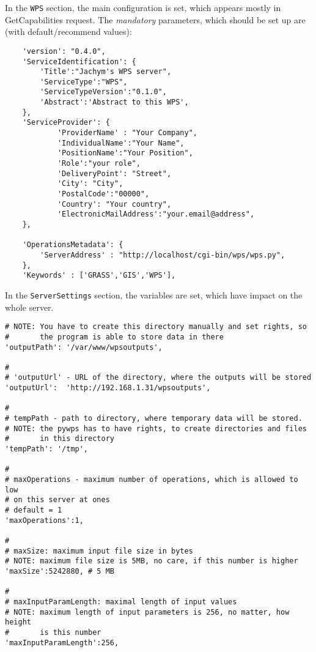 \documentclass[a4paper,11pt]{article}
\begin{document}
     
    In the \texttt{WPS} section, the main configuration is set, which appears mostly in
    GetCapabilities request. The \emph{mandatory} parameters, which should be set up
    are (with default/recommend values):
     

    \begin{verbatim}
    'version': "0.4.0",
    'ServiceIdentification': {
        'Title':"Jachym's WPS server",
        'ServiceType':"WPS",
        'ServiceTypeVersion':"0.1.0",
        'Abstract':'Abstract to this WPS',
    },
    'ServiceProvider': {
            'ProviderName' : "Your Company",
            'IndividualName':"Your Name",
            'PositionName':"Your Position",
            'Role':"your role",
            'DeliveryPoint': "Street",
            'City': "City",
            'PostalCode':"00000",
            'Country': "Your country",
            'ElectronicMailAddress':"your.email@address",
    },

    'OperationsMetadata': {
        'ServerAddress' : "http://localhost/cgi-bin/wps/wps.py",
    },
    'Keywords' : ['GRASS','GIS','WPS'],
    \end{verbatim}

     
    In the \texttt{ServerSettings} section, the variables are set, which have impact on
    the whole server.
     

    \begin{verbatim}
# NOTE: You have to create this directory manually and set rights, so
#       the program is able to store data in there 
'outputPath': '/var/www/wpsoutputs',

#
# 'outputUrl' - URL of the directory, where the outputs will be stored
'outputUrl':  'http://192.168.1.31/wpsoutputs',

#
# tempPath - path to directory, where temporary data will be stored.
# NOTE: the pywps has to have rights, to create directories and files
#       in this directory
'tempPath': '/tmp',

#
# maxOperations - maximum number of operations, which is allowed to low
# on this server at ones 
# default = 1
'maxOperations':1,

#
# maxSize: maximum input file size in bytes
# NOTE: maximum file size is 5MB, no care, if this number is higher
'maxSize':5242880, # 5 MB

#
# maxInputParamLength: maximal length of input values
# NOTE: maximum length of input parameters is 256, no matter, how height
#       is this number
'maxInputParamLength':256,
\end{verbatim}
\end{document}
